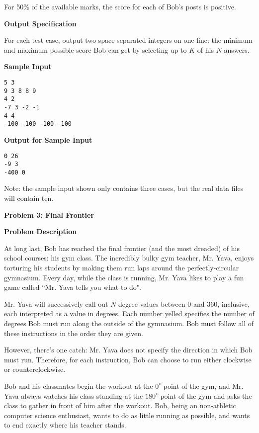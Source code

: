 \documentclass[11pt]{article}
\newcommand{\problem}[2]{\textbf{\Large Problem #1: #2} \vspace{0.4em}}
\newcommand{\heading}[1]{\vspace{0.6em} \textbf{#1}}
\begin{document}
For 50\% of the available marks, the score for each of Bob's posts is positive.


\heading{Output Specification}

For each test case, output two space-separated integers on one line: the minimum and maximum possible score Bob can get by selecting up to $K$ of his $N$ answers.


\heading{Sample Input}
\vspace{-\topsep}
\begin{verbatim}
5 3
9 3 8 8 9
4 2
-7 3 -2 -1
4 4
-100 -100 -100 -100
\end{verbatim}

\vspace{-\topsep}
\heading{Output for Sample Input}
\vspace{-\topsep}
\begin{verbatim}
0 26
-9 3
-400 0
\end{verbatim}

Note: the sample input shown only contains three cases, but the real data files will contain ten.


\pagebreak




\problem{3}{Final Frontier}


\heading{Problem Description}

At long last, Bob has reached the final frontier (and the most dreaded) of his school courses: his gym class. The incredibly bulky gym teacher, Mr. Yava, enjoys torturing his students by making them run laps around the perfectly-circular gymnasium. Every day, while the class is running, Mr. Yava likes to play a fun game called ``Mr. Yava tells you what to do".

Mr. Yava will successively call out $N$ degree values between 0 and 360, inclusive, each interpreted as a value in degrees. Each number yelled specifies the number of degrees Bob must run along the outside of the gymnasium. Bob must follow all of these instructions in the order they are given.

However, there's one catch: Mr. Yava does not specify the direction in which Bob must run. Therefore, for each instruction, Bob can choose to run either clockwise or counterclockwise.

Bob and his classmates begin the workout at the $0^{\circ}$ point of the gym, and Mr. Yava always watches his class standing at the $180^{\circ}$ point of the gym and asks the class to gather in front of him after the workout. Bob, being an non-athletic computer science enthusiast, wants to do as little running as possible, and wants to end exactly where his teacher stands.
\end{document}
